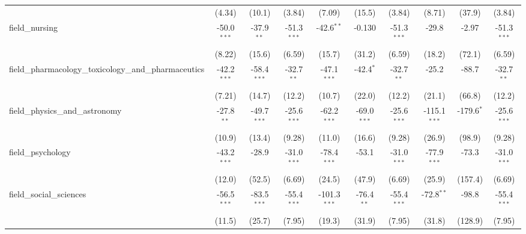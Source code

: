 \begin{tabular}{lccccccccc}
                                                               & (4.34)         & (10.1)         & (3.84)        & (7.09)         & (15.5)         & (3.84)        & (8.71)         & (37.9)         & (3.84)\\   
   field\_nursing                                              & -50.0$^{***}$  & -37.9$^{**}$   & -51.3$^{***}$ & -42.6$^{**}$   & -0.130         & -51.3$^{***}$ & -29.8          & -2.97          & -51.3$^{***}$\\   
                                                               & (8.22)         & (15.6)         & (6.59)        & (15.7)         & (31.2)         & (6.59)        & (18.2)         & (72.1)         & (6.59)\\   
   field\_pharmacology\_toxicology\_and\_pharmaceutics         & -42.2$^{***}$  & -58.4$^{***}$  & -32.7$^{**}$  & -47.1$^{***}$  & -42.4$^{*}$    & -32.7$^{**}$  & -25.2          & -88.7          & -32.7$^{**}$\\   
                                                               & (7.21)         & (14.7)         & (12.2)        & (10.7)         & (22.0)         & (12.2)        & (21.1)         & (66.8)         & (12.2)\\   
   field\_physics\_and\_astronomy                              & -27.8$^{**}$   & -49.7$^{***}$  & -25.6$^{***}$ & -62.2$^{***}$  & -69.0$^{***}$  & -25.6$^{***}$ & -115.1$^{***}$ & -179.6$^{*}$   & -25.6$^{***}$\\   
                                                               & (10.9)         & (13.4)         & (9.28)        & (11.0)         & (16.6)         & (9.28)        & (26.9)         & (98.9)         & (9.28)\\   
   field\_psychology                                           & -43.2$^{***}$  & -28.9          & -31.0$^{***}$ & -78.4$^{***}$  & -53.1          & -31.0$^{***}$ & -77.9$^{***}$  & -73.3          & -31.0$^{***}$\\   
                                                               & (12.0)         & (52.5)         & (6.69)        & (24.5)         & (47.9)         & (6.69)        & (25.9)         & (157.4)        & (6.69)\\   
   field\_social\_sciences                                     & -56.5$^{***}$  & -83.5$^{***}$  & -55.4$^{***}$ & -101.3$^{***}$ & -76.4$^{**}$   & -55.4$^{***}$ & -72.8$^{**}$   & -98.8          & -55.4$^{***}$\\   
                                                               & (11.5)         & (25.7)         & (7.95)        & (19.3)         & (31.9)         & (7.95)        & (31.8)         & (128.9)        & (7.95)\\   

\end{tabular}
